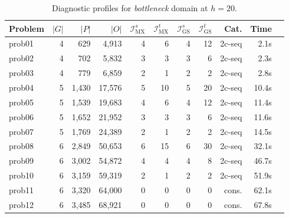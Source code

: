 \begin{table}[ht]
    \centering
    \small
    \begin{tabular}{lrrr rr rr rr r}
        \toprule
        \textbf{Problem} & $|G|$                       & $|P|$                       & $|O|$
                         & $\mathcal{I}^s_{\text{MX}}$ & $\mathcal{I}^t_{\text{MX}}$
                         & $\mathcal{I}^s_{\text{GS}}$ & $\mathcal{I}^t_{\text{GS}}$
                         & \textbf{Cat.}               & \textbf{Time}                                                             \\
        \midrule
        prob01           & 4                           & 629                         & 4{,}913  & 4 & 6  & 4 & 12 & 2c-seq & 2.1s  \\
        prob02           & 4                           & 702                         & 5{,}832  & 3 & 3  & 3 & 6  & 2c-seq & 2.3s  \\
        prob03           & 4                           & 779                         & 6{,}859  & 2 & 1  & 2 & 2  & 2c-seq & 2.8s  \\
        \midrule
        prob04           & 5                           & 1{,}430                     & 17{,}576 & 5 & 10 & 5 & 20 & 2c-seq & 10.4s \\
        prob05           & 5                           & 1{,}539                     & 19{,}683 & 4 & 6  & 4 & 12 & 2c-seq & 11.4s \\
        prob06           & 5                           & 1{,}652                     & 21{,}952 & 3 & 3  & 3 & 6  & 2c-seq & 11.6s \\
        prob07           & 5                           & 1{,}769                     & 24{,}389 & 2 & 1  & 2 & 2  & 2c-seq & 14.5s \\
        \midrule
        prob08           & 6                           & 2{,}849                     & 50{,}653 & 6 & 15 & 6 & 30 & 2c-seq & 32.1s \\
        prob09           & 6                           & 3{,}002                     & 54{,}872 & 4 & 4  & 4 & 8  & 2c-seq & 46.7s \\
        prob10           & 6                           & 3{,}159                     & 59{,}319 & 2 & 1  & 2 & 2  & 2c-seq & 51.9s \\
        prob11           & 6                           & 3{,}320                     & 64{,}000 & 0 & 0  & 0 & 0  & cons.  & 62.1s \\
        prob12           & 6                           & 3{,}485                     & 68{,}921 & 0 & 0  & 0 & 0  & cons.  & 67.8s \\
        \bottomrule
    \end{tabular}
    \caption{Diagnostic profiles for \textit{bottleneck} domain at $h = 20$.}
    \label{tab:bottleneck_results}
\end{table}

